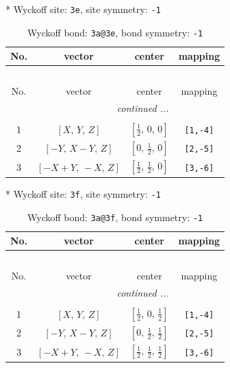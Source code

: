 \documentclass[fleqn,8pt]{jsarticle}
\begin{document}
* Wyckoff site: {\tt 3e}, site symmetry: {\tt -1}
\renewcommand{\arraystretch}{1.2}
\begin{longtable}{cccc}
\caption{Wyckoff bond: {\tt 3a@3e}, bond symmetry: {\tt -1}}
 \\
 \hline \hline
No. & vector & center & mapping \\ \hline \endfirsthead

\multicolumn{3}{l}{\tablename\ \thetable{}} \\
 \hline \hline
No. & vector & center & mapping \\ \hline \endhead

 \hline \hline
\multicolumn{3}{r}{\footnotesize\it continued ...} \\ \endfoot

 \hline \hline
\multicolumn{3}{r}{} \\ \endlastfoot

1 & $\left[ X,\, Y,\, Z \right]$ & $\left[ \frac{1}{2},\, 0,\, 0 \right]$ & {\tt [1,-4]} \\ \hline
2 & $\left[ - Y,\, X - Y,\, Z \right]$ & $\left[ 0,\, \frac{1}{2},\, 0 \right]$ & {\tt [2,-5]} \\ \hline
3 & $\left[ - X + Y,\, - X,\, Z \right]$ & $\left[ \frac{1}{2},\, \frac{1}{2},\, 0 \right]$ & {\tt [3,-6]} \\
\end{longtable}
* Wyckoff site: {\tt 3f}, site symmetry: {\tt -1}
\renewcommand{\arraystretch}{1.2}
\begin{longtable}{cccc}
\caption{Wyckoff bond: {\tt 3a@3f}, bond symmetry: {\tt -1}}
 \\
 \hline \hline
No. & vector & center & mapping \\ \hline \endfirsthead

\multicolumn{3}{l}{\tablename\ \thetable{}} \\
 \hline \hline
No. & vector & center & mapping \\ \hline \endhead

 \hline \hline
\multicolumn{3}{r}{\footnotesize\it continued ...} \\ \endfoot

 \hline \hline
\multicolumn{3}{r}{} \\ \endlastfoot

1 & $\left[ X,\, Y,\, Z \right]$ & $\left[ \frac{1}{2},\, 0,\, \frac{1}{2} \right]$ & {\tt [1,-4]} \\ \hline
2 & $\left[ - Y,\, X - Y,\, Z \right]$ & $\left[ 0,\, \frac{1}{2},\, \frac{1}{2} \right]$ & {\tt [2,-5]} \\ \hline
3 & $\left[ - X + Y,\, - X,\, Z \right]$ & $\left[ \frac{1}{2},\, \frac{1}{2},\, \frac{1}{2} \right]$ & {\tt [3,-6]} \\
\end{longtable}
\end{document}
